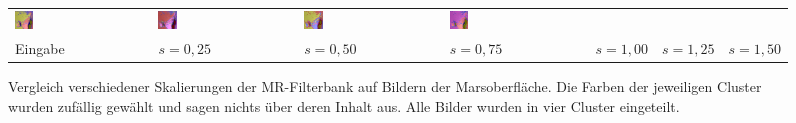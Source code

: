 \begin{figure}[h!]
\begin{tabular}{C{0.14\textwidth}C{0.14\textwidth}C{0.14\textwidth}C{0.14\textwidth}C{0.14\textwidth}C{0.14\textwidth}C{0.14\textwidth}}
		\includegraphics[width=0.14\textwidth]{images/gen/filter_size/p03_04.png_0.75.png} &
		\includegraphics[width=0.14\textwidth]{images/gen/filter_size/p03_04.png_1.00.png} &
		\includegraphics[width=0.14\textwidth]{images/gen/filter_size/p03_04.png_1.25.png} &
		\includegraphics[width=0.14\textwidth]{images/gen/filter_size/p03_04.png_1.50.png} \\
		
		\hspace{2pt}\newline\centering Eingabe & 
		\hspace{2pt}\newline\centering $s=0,25$ &
		\hspace{2pt}\newline\centering $s=0,50$ &
		\hspace{2pt}\newline\centering $s=0,75$ &
		\hspace{2pt}\newline\centering $s=1,00$ &
		\hspace{2pt}\newline\centering $s=1,25$ &
		\hspace{2pt}\newline\centering $s=1,50$
	\end{tabular}
	\caption{Vergleich verschiedener Skalierungen der MR-Filterbank auf Bildern der Marsoberfläche. Die Farben der jeweiligen Cluster wurden zufällig gewählt und sagen nichts über deren Inhalt aus. Alle Bilder wurden in vier Cluster eingeteilt.}
	\label{fig:filterbank_sizes}
\end{figure}

